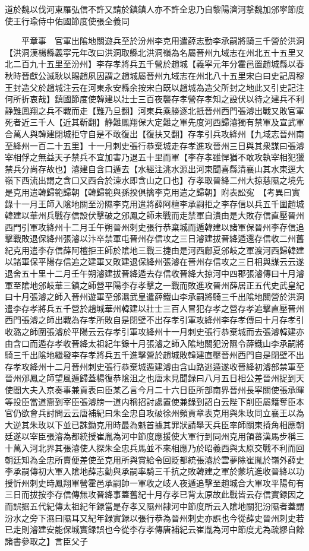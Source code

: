 道於魏以伐河東羅弘信不許又請於鎮鎮人亦不許全忠乃自黎陽濟河撃魏加邠寜節度使王行瑜侍中佑國節度使張全義同

　　平章事　官軍出隂地關遊兵至於汾州李克用遣薛志勤李承嗣將騎三千營於洪洞【洪洞漢楊縣義寜元年改曰洪洞取縣北洪洞嶺為名屬晉州九域志在州北五十五里又北二百九十五里至汾州】李存孝將兵五千營於趙城【義寜元年分霍邑置趙城縣以春秋時晉獻公滅耿以賜趙夙因謂之趙城屬晉州九域志在州北八十五里宋白曰史記周穆王封造父於趙城注云在河東永安縣余按宋白既以趙城為造父所封之地此又引史記注何所折衷哉】鎮國節度使韓建以壯士三百夜襲存孝營存孝知之設伏以待之建兵不利静難鳳翔之兵不戰而走【難乃旦翻】河東兵乘勝逐北扺晉州西門張濬出戰又敗官軍死者近三千人【近其靳翻】静難鳳翔保大定難之軍先度河西歸濬獨有禁軍及宣武軍合萬人與韓建閉城拒守自是不敢復出【復扶又翻】存孝引兵攻絳州【九域志晉州南至絳州一百二十五里】十一月刺史張行恭棄城走存孝進攻晉州三日與其衆謀曰張濬宰相俘之無益天子禁兵不宜加害乃退五十里而軍【李存孝雖悍猶不敢攻執宰相犯獵禁兵分尚存故也】濬建自含口遁去【水經注洮水源出河東聞喜縣清襄山其水東逕大嶺下西流出謂之含口又西合於涑水即含山之口也】存孝取晉絳二州大掠慈隰之境先是克用遣韓歸範歸朝【韓歸範與孫揆俱擒李克用遣之歸朝】附表訟寃　【考異曰實錄十一月王師入隂地關至汾隰李克用遣將薛阿檀李承嗣拒之李存信以兵五千圍趙城韓建以華州兵戰存信設伏擊破之邠鳳之師未戰而走禁軍自潰由是大敗存信直壓晉州西門引軍攻絳州十二月壬午朔晉州刺史張行恭棄城而遁韓建以諸軍保晉州李存信追擊戰敗退保絳州張濬以汴卒禁軍屯晉州存信攻之三日濬建拔晉絳遁還存信收二州舊紀克用遣李存信薛阿檀拒王師於隂地三戰三捷由是河西鄜夏邠岐之軍渡河西歸韓建以諸軍保平陽存信追之建軍又敗建退保絳州張濬在晉州存信攻之三日相與謀云云遂退舍五十里十二月壬午朔濬建拔晉絳遁去存信收晉絳大掠河中四郡張濬傳曰十月濬軍至隂地邠岐華三鎮之師營平陽李存孝擊之一戰而敗進攻晉州薛居正五代史武皇紀曰十月張濬之師入晉州遊軍至邠濕武皇遣薛鐵山李承嗣將騎三千出隂地關營於洪洞遣李存孝將兵五千營於趙城華州韓建以壯士三百人冒犯存孝之營存孝追擊直壓晉州西門張濬之師出戰為存孝所敗自是閉壁不出存孝引軍攻絳州李存孝傳曰十月存孝引收潞之師圍張濬於平陽云云存孝引軍攻絳州十一月刺史張行恭棄城而去張濬韓建亦由含口而遁存孝收晉絳太祖紀年錄十月張濬之師入隂地關犯汾隰令薛鐵山李承嗣將騎三千出隂地繼發李存孝將兵五千進擊營於趙城敗韓建直壓晉州西門自是閉壁不出存孝攻絳州十二月晉州刺史張行恭棄城遁建濬由含山路逃遁遂收晉絳初濬部禁軍至晉州邠鳳之師望風遁歸蓋楊復恭隂沮之也唐末見聞録曰八月五日相公差晉州捉到天使閭大夫入京奏事兼貢表曰臣某乙言今月二十六日臣所部南界晉州長寜關使張承暉等投臣當道齎到宰臣張濬牓一道内稱招討處置使兼錄到詔白云陛下削臣屬籍奪臣本官仍欲會兵討問云云唐補紀曰朱全忠自攻破徐州頻貢章表克用與朱玫同立襄王以為大逆其朱玫以下並已誅鋤克用時最為魁首據其罪狀請舉天兵臣率師關東掎角相應朝廷遂以宰臣張濬為都統授崔胤為河中節度應援使大軍行到同州克用領蕃漢馬步稱三十萬入河北界其張濬使人探朱全忠兵馬並不來相應乃於昭義西與太原交戰不利而回朝廷知為全忠所賣便差使至克用所與賞給令回貶都統張濬於雲夢除崔胤於嶺外薛史李承嗣傳初大軍入隂地薛志勤與承嗣率騎三千抗之敗韓建之軍於蒙坑進收晉絳以功授忻州刺史時鳳翔軍營霍邑承嗣帥一軍收之岐人夜遁追擊至趙城合大軍攻平陽旬有三日而拔按李存信傳無攻晉絳事蓋舊紀十月存孝已背太原故此戰皆云存信實録因之而誤据五代紀傳太祖紀年録當是存孝又隰州隸河中節度所云入隂地關犯汾隰者蓋謂汾水之旁下濕曰隰耳又紀年録實録以張行恭為晉州刺史亦誤也今從薛史晉州刺史若已走則濬建安能保城實録誤也今從李存孝傳唐補紀云崔胤為河中節度尤為疏繆自餘諸書參取之】言臣父子